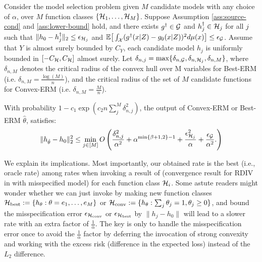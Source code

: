 \begin{theorem}  \label{thm:model_selection}
    Consider the model selection problem given $M$ candidate models with any choice of $\alpha$, over $M$ function classes $\{\mathcal{H}_1, \dots, \mathcal{H}_M\}$. Suppose Assumption \ref{ass:source-cond} and \ref{ass:lower-bound} hold, and there exists $g^{\dag} \in \mathcal{G}$ and  $h^{\dag}_j\in \mathcal{H}_j$ for all $j$ such that $\|h_0 - h^{\dag}_j\|_2 \leq \epsilon_{\mathcal{H}_j}$ and  $\mathbb{E}\big[\int_{\mathcal{X}} (g^{\dag}(x|Z) - g_0(x|Z)  )^2 d \mu(x)\big] \leq \epsilon_{\mathcal{G}}$. Assume that $Y$ is almost surely bounded by $C_Y$, each candidate model $h_j$ is uniformly bounded in $[-C_{\mathcal{H}},C_{\mathcal{H}}]$ almost surely. Let $\delta_{n,j} = \max\{\delta_{n,\mathcal{G}},\delta_{n,\mathcal{H}_j}, \delta_{n,M}\}$, where $\delta_{n,M}$ denotes the critical radius of the convex hull over M variables for Best-ERM (i.e. $\delta_{n,M} = \frac{\log(M)}{n}$), and the critical radius of the set of $M$ candidate functions for Convex-ERM (i.e. $\delta_{n,M} = \frac{M}{n}$). 
    
    With probability $1-c_1 \exp(c_2 n \sum_j^M\delta_{n,j}^2)$, the output of Convex-ERM or Best-ERM $\hat{\theta}$, satisfies:
    \begin{align*}
        \|h_{\hat{\theta}} - h_0\|_2^2 \leq \min_{j \in [M]}O\left(\frac{\delta_{n,j}^2 }{\alpha^2} + \alpha^{\min\{\beta+1,2\}-1} +\frac{\epsilon_{\mathcal{H}_j}^2}{\alpha}  +  \frac{\epsilon_{\mathcal{G}}}{\alpha^2}. \right)
    \end{align*}
\end{theorem}


We explain its implications. Most importantly, our obtained rate is the best (i.e., oracle rate) among rates when invoking a result of (convergence result for RDIV in  with misspecified model) for each function class $\mathcal{H}_i$. 
Some astute readers might wonder whether we can just invoke  by making new function classes $\mathcal{H}_{\text{best}}:=\{h_{\theta}:\theta=e_1,\dots,e_M\}$ or $\mathcal{H}_{\text{conv}}:=\{h_{\theta}:\sum_j \theta_j = 1, \theta_j \geq 0 \}$, and bound the misspecification error $\epsilon_{\mathcal{H}_{\text{conv}}}$ or $\epsilon_{\mathcal{H}_{\text{best}}}$ by $\|h_j - h_0\|$ will lead to a slower rate with an extra factor of $\frac{1}{\alpha}$. The key is only to handle the misspecification error once to avoid the $\frac{1}{\alpha}$ factor by deferring the invocation of strong convexity and working with the excess risk (difference in the expected loss) instead of the $L_2$ difference.



